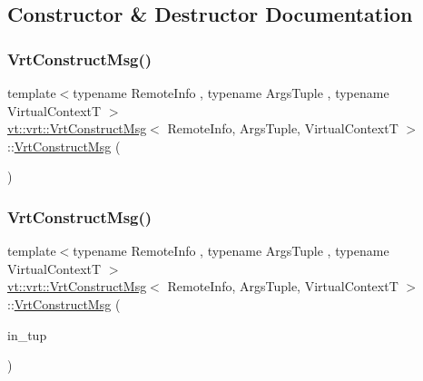\subsection{Constructor \& Destructor Documentation}
\mbox{\label{structvt_1_1vrt_1_1_vrt_construct_msg_a5beda0ba3e8ea8c303cf95040c567862}} 
\subsubsection{\texorpdfstring{Vrt\+Construct\+Msg()}{VrtConstructMsg()}\hspace{0.1cm}{\footnotesize\ttfamily [1/2]}}
{\footnotesize\ttfamily template$<$typename Remote\+Info , typename Args\+Tuple , typename Virtual\+ContextT $>$ \\
\hyperlink{structvt_1_1vrt_1_1_vrt_construct_msg}{vt\+::vrt\+::\+Vrt\+Construct\+Msg}$<$ Remote\+Info, Args\+Tuple, Virtual\+ContextT $>$\+::\hyperlink{structvt_1_1vrt_1_1_vrt_construct_msg}{Vrt\+Construct\+Msg} (\begin{DoxyParamCaption}{ }\end{DoxyParamCaption})\hspace{0.3cm}{\ttfamily [default]}}

\mbox{\label{structvt_1_1vrt_1_1_vrt_construct_msg_a30036d2df53914ad5d1b4e354d723040}} 
\subsubsection{\texorpdfstring{Vrt\+Construct\+Msg()}{VrtConstructMsg()}\hspace{0.1cm}{\footnotesize\ttfamily [2/2]}}
{\footnotesize\ttfamily template$<$typename Remote\+Info , typename Args\+Tuple , typename Virtual\+ContextT $>$ \\
\hyperlink{structvt_1_1vrt_1_1_vrt_construct_msg}{vt\+::vrt\+::\+Vrt\+Construct\+Msg}$<$ Remote\+Info, Args\+Tuple, Virtual\+ContextT $>$\+::\hyperlink{structvt_1_1vrt_1_1_vrt_construct_msg}{Vrt\+Construct\+Msg} (\begin{DoxyParamCaption}\item[{Args\+Tuple \&\&}]{in\+\_\+tup }\end{DoxyParamCaption})\hspace{0.3cm}{\ttfamily [inline]}}



